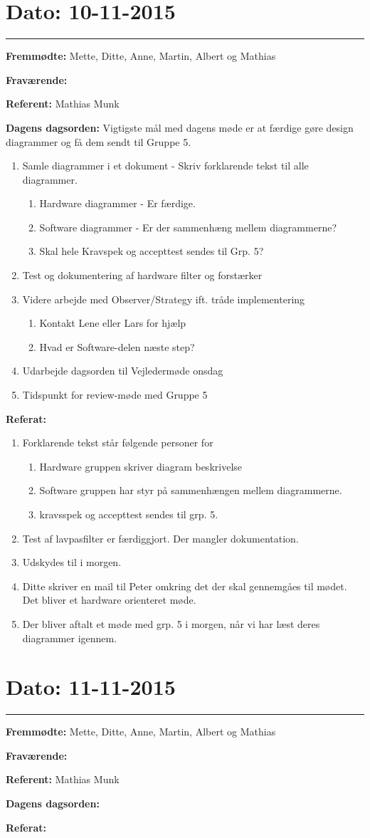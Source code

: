 \section{Dato: 10-11-2015}
\hrule

\textbf{Fremmødte:} Mette, Ditte, Anne, Martin, Albert og Mathias 

\textbf{Fraværende:}

\textbf{Referent:} Mathias Munk

\textbf{Dagens dagsorden:}
Vigtigste mål med dagens møde er at færdige gøre design diagrammer og få dem sendt til Gruppe 5.
\begin{enumerate}
\item Samle diagrammer i et dokument - Skriv forklarende tekst til alle diagrammer.
\begin{enumerate}
\item Hardware diagrammer - Er færdige.
\item Software diagrammer - Er der sammenhæng mellem diagrammerne?
\item Skal hele Kravspek og accepttest sendes til Grp. 5?
\end{enumerate}
\item Test og dokumentering af hardware filter og forstærker
\item Videre arbejde med Observer/Strategy ift. tråde implementering
\begin{enumerate}
\item Kontakt Lene eller Lars for hjælp
\item Hvad er Software-delen næste step?
\end{enumerate}
\item Udarbejde dagsorden til Vejledermøde onsdag
\item Tidspunkt for review-møde med Gruppe 5
\end{enumerate}

\textbf{Referat:}
\begin{enumerate}
\item Forklarende tekst står følgende personer for
\begin{enumerate}
\item Hardware gruppen skriver diagram beskrivelse
\item Software gruppen har styr på sammenhængen mellem diagrammerne.
\item kravsspek og accepttest sendes til grp. 5. 
\end{enumerate}
\item Test af lavpasfilter er færdiggjort. Der mangler dokumentation. 
\item Udskydes til i morgen.
\item Ditte skriver en mail til Peter omkring det der skal gennemgåes til mødet. Det bliver et hardware orienteret møde.
\item Der bliver aftalt et møde med grp. 5 i morgen, når vi har læst deres diagrammer igennem.
\end{enumerate}

\section{Dato: 11-11-2015}
\hrule

\textbf{Fremmødte:} Mette, Ditte, Anne, Martin, Albert og Mathias 

\textbf{Fraværende:}

\textbf{Referent:} Mathias Munk

\textbf{Dagens dagsorden:}

\textbf{Referat:}
\newline 